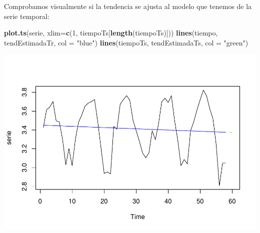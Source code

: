 \documentclass[]{article}
\newenvironment{Shaded}{\begin{snugshade}}{\end{snugshade}}
\newcommand{\KeywordTok}[1]{\textcolor[rgb]{0.13,0.29,0.53}{\textbf{#1}}}
\newcommand{\DataTypeTok}[1]{\textcolor[rgb]{0.13,0.29,0.53}{#1}}
\newcommand{\DecValTok}[1]{\textcolor[rgb]{0.00,0.00,0.81}{#1}}
\newcommand{\StringTok}[1]{\textcolor[rgb]{0.31,0.60,0.02}{#1}}
\newcommand{\CommentTok}[1]{\textcolor[rgb]{0.56,0.35,0.01}{\textit{#1}}}
\newcommand{\OperatorTok}[1]{\textcolor[rgb]{0.81,0.36,0.00}{\textbf{#1}}}
\newcommand{\NormalTok}[1]{#1}
\begin{document}
\begin{Shaded}
\end{Shaded}

Comprobamos visualmente si la tendencia se ajusta al modelo que tenemos
de la serie temporal:

\begin{Shaded}
\begin{Highlighting}[]
\KeywordTok{plot.ts}\NormalTok{(serie, }\DataTypeTok{xlim=}\KeywordTok{c}\NormalTok{(}\DecValTok{1}\NormalTok{, tiempoTs[}\KeywordTok{length}\NormalTok{(tiempoTs)])) }
\KeywordTok{lines}\NormalTok{(tiempo, tendEstimadaTr, }\DataTypeTok{col =} \StringTok{"blue"}\NormalTok{) }
\KeywordTok{lines}\NormalTok{(tiempoTs, tendEstimadaTs, }\DataTypeTok{col =} \StringTok{"green"}\NormalTok{)}
\end{Highlighting}
\end{Shaded}

\includegraphics{timeSeries_files/figure-latex/unnamed-chunk-14-1.pdf}
\end{document}

